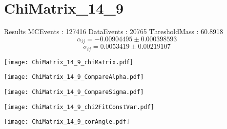 \documentclass[a4paper,12pt]{article}
\begin{document}
\section{ChiMatrix\_14\_9}
\begin{minipage}{0.49\linewidth} Results \newline
MCEvents : 127416\newline
DataEvents : 20765 \newline
ThresholdMass : 60.8918\\
$$\alpha_{ij} = -0.00904495\pm 0.000398593$$
$$\sigma_{ij} = 0.0053419\pm 0.00219107$$
\end{minipage}\hfill
\begin{minipage}{0.49\linewidth} 
\texttt{[image: ChiMatrix\_14\_9\_chiMatrix.pdf]}\\
\end{minipage}
\hfill
\begin{minipage}{0.49\linewidth} 
\texttt{[image: ChiMatrix\_14\_9\_CompareAlpha.pdf]}\\
\end{minipage}
\hfill
\begin{minipage}{0.49\linewidth} 
\texttt{[image: ChiMatrix\_14\_9\_CompareSigma.pdf]}\\
\end{minipage}
\begin{minipage}{0.49\linewidth} 
\texttt{[image: ChiMatrix\_14\_9\_chi2FitConstVar.pdf]}\\
\end{minipage}
\hfill
\begin{minipage}{0.49\linewidth} 
\texttt{[image: ChiMatrix\_14\_9\_corAngle.pdf]}\\
\end{minipage}
\end{document}
